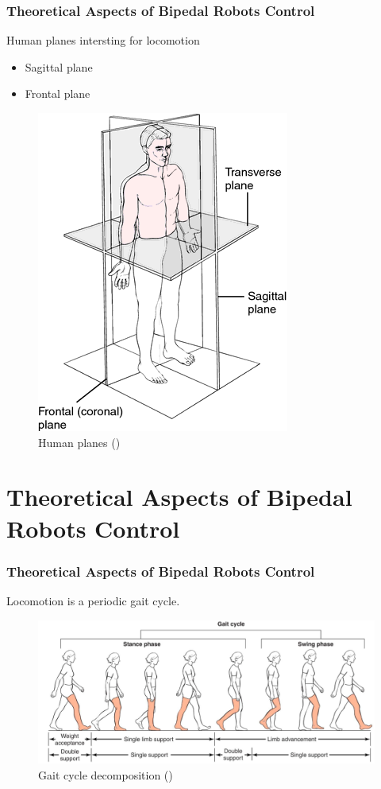 \documentclass{beamer}
\begin{document}

	\begin{frame}
		\frametitle{Theoretical Aspects of Bipedal Robots Control}
		\begin{block}{Human planes intersting for locomotion}
			\begin{itemize}
				\item
				Sagittal plane
				\item
				Frontal plane
				
			\end{itemize}
		\end{block}
		
		\begin{figure}[h!]
			\begin{minipage}[H]{\linewidth}
				\centering
				\includegraphics[width=0.3\linewidth]{presentation_images/12}
				\caption{Human planes (\cite{medical})}
			\end{minipage}
		\end{figure}
	\end{frame}
	
	
	\section*{Theoretical Aspects of Bipedal Robots Control}
	\begin{frame}
		\frametitle{Theoretical Aspects of Bipedal Robots Control}
		\centering
		Locomotion is a periodic gait cycle.
		
		\begin{figure}[h!]
			\begin{minipage}[H]{\linewidth}
				\includegraphics[width=\linewidth]{presentation_images/26}
				\caption{Gait cycle decomposition (\cite{gait})}
			\end{minipage}
		\end{figure}
	\end{frame}
\end{document}
